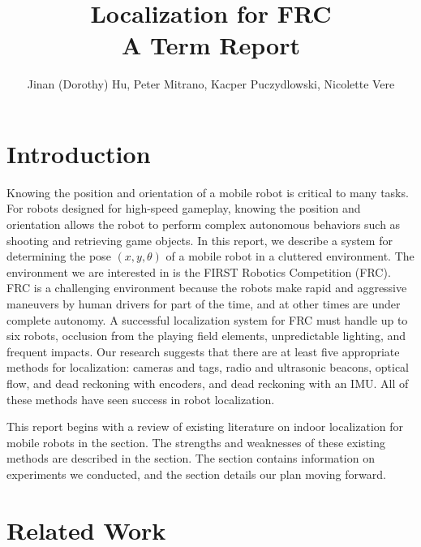 \documentclass{article}
\begin{document}
\title{Localization for FRC \\
  \large{A Term Report}
  }
\author{Jinan (Dorothy) Hu, Peter Mitrano, Kacper Puczydlowski, Nicolette Vere}

\maketitle{}

\section{Introduction}

Knowing the position and orientation of a mobile robot is critical to many tasks. For robots designed for high-speed gameplay, knowing the position and orientation allows the robot to perform complex autonomous behaviors such as shooting and retrieving game objects. In this report, we describe a system for determining the pose $(x, y, \theta)$ of a mobile robot in a cluttered environment. The environment we are interested in is the FIRST Robotics Competition (FRC). FRC is a challenging environment because the robots make rapid and aggressive maneuvers by human drivers for part of the time, and at other times are under complete autonomy. A successful localization system for FRC must handle up to six robots, occlusion from the playing field elements, unpredictable lighting, and frequent impacts. Our research suggests that there are at least five appropriate methods for localization: cameras and tags, radio and ultrasonic beacons, optical flow, and dead reckoning with encoders, and dead reckoning with an IMU. All of these methods have seen success in robot localization.

This report begins with a review of existing literature on indoor localization for mobile robots in the  section. The strengths and weaknesses of these existing methods are described in the  section. The  section contains information on experiments we conducted, and the  section details our plan moving forward.

\section{Related Work} \label{related_work}
\end{document}
